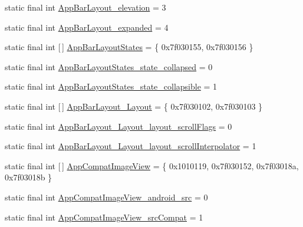 \begin{DoxyCompactItemize}
\item 
static final int \mbox{\hyperlink{classandroid_1_1support_1_1design_1_1_r_1_1styleable_aa5bd8cba190544da5bbd7dcf760146ce}{App\+Bar\+Layout\+\_\+elevation}} = 3
\item 
static final int \mbox{\hyperlink{classandroid_1_1support_1_1design_1_1_r_1_1styleable_a965848a88c548e64fa7f537bd7cc68fc}{App\+Bar\+Layout\+\_\+expanded}} = 4
\item 
static final int \mbox{[}$\,$\mbox{]} \mbox{\hyperlink{classandroid_1_1support_1_1design_1_1_r_1_1styleable_a74f59a98e1a6b60a9b0105b06a7c47de}{App\+Bar\+Layout\+States}} = \{ 0x7f030155, 0x7f030156 \}
\item 
static final int \mbox{\hyperlink{classandroid_1_1support_1_1design_1_1_r_1_1styleable_aad3006313ce2fa9348c295671857aa6a}{App\+Bar\+Layout\+States\+\_\+state\+\_\+collapsed}} = 0
\item 
static final int \mbox{\hyperlink{classandroid_1_1support_1_1design_1_1_r_1_1styleable_a38f559cb609d2a15dc5286c608e44af3}{App\+Bar\+Layout\+States\+\_\+state\+\_\+collapsible}} = 1
\item 
static final int \mbox{[}$\,$\mbox{]} \mbox{\hyperlink{classandroid_1_1support_1_1design_1_1_r_1_1styleable_a2ae24fbf6ad959261eae1d48e6785f26}{App\+Bar\+Layout\+\_\+\+Layout}} = \{ 0x7f030102, 0x7f030103 \}
\item 
static final int \mbox{\hyperlink{classandroid_1_1support_1_1design_1_1_r_1_1styleable_ae17e2fff1ab1fa2e76d54bffcbc0b7a1}{App\+Bar\+Layout\+\_\+\+Layout\+\_\+layout\+\_\+scroll\+Flags}} = 0
\item 
static final int \mbox{\hyperlink{classandroid_1_1support_1_1design_1_1_r_1_1styleable_a8def336188967609892f562546f9fab6}{App\+Bar\+Layout\+\_\+\+Layout\+\_\+layout\+\_\+scroll\+Interpolator}} = 1
\item 
static final int \mbox{[}$\,$\mbox{]} \mbox{\hyperlink{classandroid_1_1support_1_1design_1_1_r_1_1styleable_ada1b5e4475936c9e01181fdb4d8cb6c9}{App\+Compat\+Image\+View}} = \{ 0x1010119, 0x7f030152, 0x7f03018a, 0x7f03018b \}
\item 
static final int \mbox{\hyperlink{classandroid_1_1support_1_1design_1_1_r_1_1styleable_a91574d14dc3fe2fd351bdb829d2c1c7e}{App\+Compat\+Image\+View\+\_\+android\+\_\+src}} = 0
\item 
static final int \mbox{\hyperlink{classandroid_1_1support_1_1design_1_1_r_1_1styleable_a401c665da120b8a6fccd1aeda1d932d9}{App\+Compat\+Image\+View\+\_\+src\+Compat}} = 1
\item 

\end{DoxyCompactItemize}
